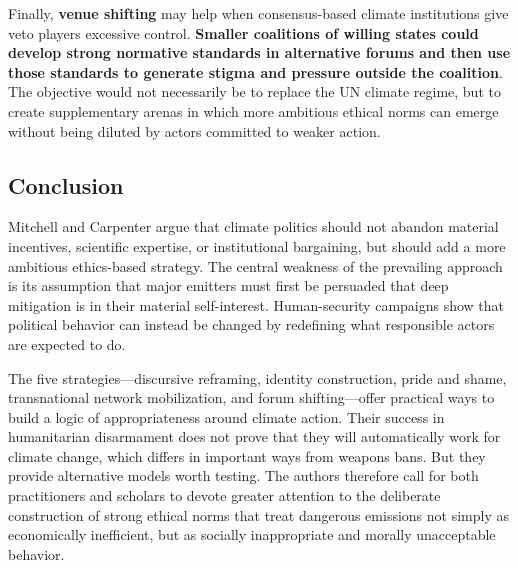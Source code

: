 Finally, \textbf{venue shifting} may help when consensus-based climate institutions give veto players excessive control. \textbf{Smaller coalitions of willing states could develop strong normative standards in alternative forums and then use those standards to generate stigma and pressure outside the coalition}. The objective would not necessarily be to replace the UN climate regime, but to create supplementary arenas in which more ambitious ethical norms can emerge without being diluted by actors committed to weaker action.

\subsection{Conclusion}

Mitchell and Carpenter argue that climate politics should not abandon material incentives, scientific expertise, or institutional bargaining, but should add a more ambitious ethics-based strategy. The central weakness of the prevailing approach is its assumption that major emitters must first be persuaded that deep mitigation is in their material self-interest. Human-security campaigns show that political behavior can instead be changed by redefining what responsible actors are expected to do.

The five strategies---discursive reframing, identity construction, pride and shame, transnational network mobilization, and forum shifting---offer practical ways to build a logic of appropriateness around climate action. Their success in humanitarian disarmament does not prove that they will automatically work for climate change, which differs in important ways from weapons bans. But they provide alternative models worth testing. The authors therefore call for both practitioners and scholars to devote greater attention to the deliberate construction of strong ethical norms that treat dangerous emissions not simply as economically inefficient, but as socially inappropriate and morally unacceptable behavior.
